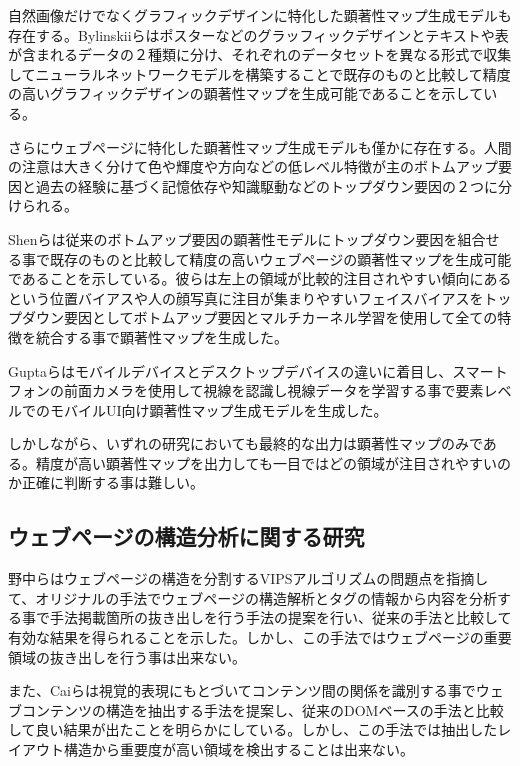 \par 自然画像だけでなくグラフィックデザインに特化した顕著性マップ生成モデルも存在する。Bylinskiiらはポスターなどのグラッフィックデザインとテキストや表が含まれるデータの２種類に分け、それぞれのデータセットを異なる形式で収集してニューラルネットワークモデルを構築することで既存のものと比較して精度の高いグラフィックデザインの顕著性マップを生成可能であることを示している\cite{bylinskii2017learning}。

\par さらにウェブページに特化した顕著性マップ生成モデルも僅かに存在する。人間の注意は大きく分けて色や輝度や方向などの低レベル特徴が主のボトムアップ要因と過去の経験に基づく記憶依存や知識駆動などのトップダウン要因の２つに分けられる。
\par Shenらは従来のボトムアップ要因の顕著性モデルにトップダウン要因を組合せる事で既存のものと比較して精度の高いウェブページの顕著性マップを生成可能であることを示している\cite{shen2014webpage}。彼らは左上の領域が比較的注目されやすい傾向にあるという位置バイアスや人の顔写真に注目が集まりやすいフェイスバイアスをトップダウン要因としてボトムアップ要因とマルチカーネル学習を使用して全ての特徴を統合する事で顕著性マップを生成した。
\par Guptaらはモバイルデバイスとデスクトップデバイスの違いに着目し、スマートフォンの前面カメラを使用して視線を認識し視線データを学習する事で要素レベルでのモバイルUI向け顕著性マップ生成モデルを生成した\cite{Gupta_2018}。

\par しかしながら、いずれの研究においても最終的な出力は顕著性マップのみである。精度が高い顕著性マップを出力しても一目ではどの領域が注目されやすいのか正確に判断する事は難しい。


\subsection{ウェブページの構造分析に関する研究}
\par 野中らはウェブページの構造を分割するVIPSアルゴリズムの問題点を指摘して、オリジナルの手法でウェブページの構造解析とタグの情報から内容を分析する事で手法掲載箇所の抜き出しを行う手法の提案を行い、従来の手法と比較して有効な結果を得られることを示した\cite{weko_66695_1}。しかし、この手法ではウェブページの重要領域の抜き出しを行う事は出来ない。

\par また、Caiらは視覚的表現にもとづいてコンテンツ間の関係を識別する事でウェブコンテンツの構造を抽出する手法を提案し、従来のDOMベースの手法と比較して良い結果が出たことを明らかにしている\cite{cai2003extracting}。しかし、この手法では抽出したレイアウト構造から重要度が高い領域を検出することは出来ない。







